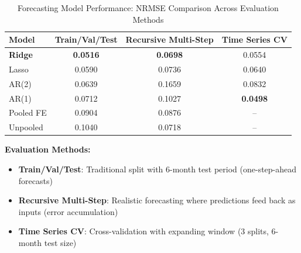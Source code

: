 
\begin{table}[htbp]
\centering
\caption{Forecasting Model Performance: NRMSE Comparison Across Evaluation Methods}
\label{tab:forecasting_nrmse}
\begin{tabular}{@{} l ccc @{}}
\toprule
\textbf{Model} & \textbf{Train/Val/Test} & \textbf{Recursive Multi-Step} & \textbf{Time Series CV} \\
\midrule
\textbf{Ridge} & \textbf{0.0516} & \textbf{0.0698} & 0.0554 \\
Lasso & 0.0590 & 0.0736 & 0.0640 \\
AR(2) & 0.0639 & 0.1659 & 0.0832 \\
AR(1) & 0.0712 & 0.1027 & \textbf{0.0498} \\
Pooled FE & 0.0904 & 0.0876 & -- \\
Unpooled & 0.1040 & 0.0718 & -- \\
\bottomrule
\end{tabular}
\end{table}

\vspace{0.3cm}
\noindent \textbf{Evaluation Methods:}
\begin{itemize}
    \item \textbf{Train/Val/Test}: Traditional split with 6-month test period (one-step-ahead forecasts)
    \item \textbf{Recursive Multi-Step}: Realistic forecasting where predictions feed back as inputs (error accumulation)
    \item \textbf{Time Series CV}: Cross-validation with expanding window (3 splits, 6-month test size)
\end{itemize}
